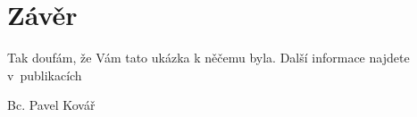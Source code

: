 \section{Závěr}
\label{sec:Conclusion}
Tak doufám, že Vám tato ukázka k něčemu byla. Další informace najdete v~publikacích

\bigskip
\begin{flushright}
Bc. Pavel Kovář
\end{flushright}